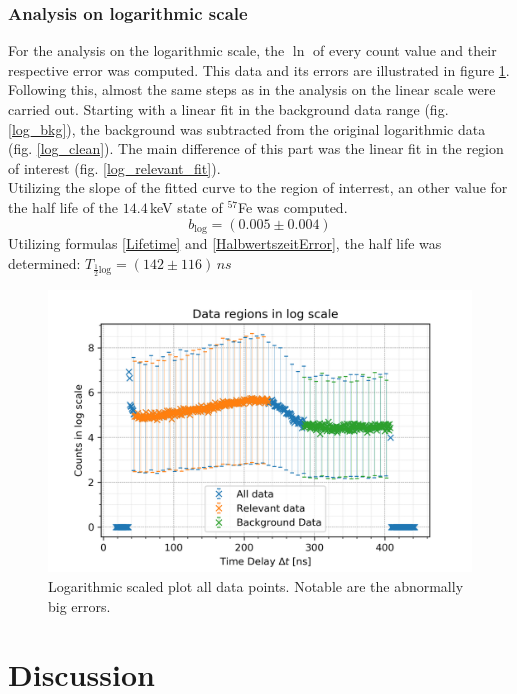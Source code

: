 \documentclass[30pt,a4paper]{article}
\begin{document}
	\subsubsection{Analysis on logarithmic scale}
	For the analysis on the logarithmic scale, the $\ln$ of every count value and their
	respective error was computed. This data and its errors are illustrated in figure 
	\ref{data_log}. Following this, almost the same steps as in the analysis on the linear scale
	were carried out. Starting with a linear fit in the background data range (fig. \ref{log_bkg}), the background was subtracted from the original logarithmic data (fig. \ref{log_clean}). The main difference of this part was the linear fit 
	in the region of interest (fig. \ref{log_relevant_fit}).\\
	Utilizing the slope of the fitted curve to the region of interrest, an other value for the half life of the $14.4$\,keV state of $^{57}$Fe was computed.
	$$b_{\textrm{log}} = (0.005\pm0.004)$$
	Utilizing formulas \ref{Lifetime} and \ref{HalbwertszeitError}, the half life was
	determined:	$T_{\frac{1}{2} \textrm{log}} = (142\pm 116)\,ns$
	
	\begin{figure}[h]
		\includegraphics{Bilder/data_log}
		\centering
		\caption[Data with on logarithmic scale]{\small Logarithmic scaled plot all data points.
			 Notable are the abnormally big errors.}
		\label{data_log}
	\end{figure}
	
 	\FloatBarrier
 	\section{Discussion}
\end{document}
